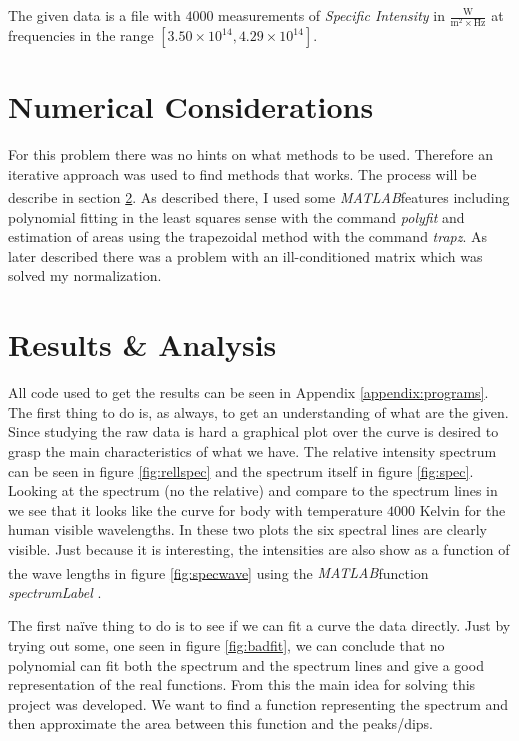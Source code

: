 \documentclass[10pt, a4paper]{article}
\newcommand{\matlab}{\small{\emph{MATLAB\textsuperscript{\textregistered}}}}
\begin{document}
The given data is a file with $4000$ measurements of \emph{Specific Intensity} in $\frac{\mathrm{W}}{\mathrm{m}^2\times \mathrm{Hz}}$ at frequencies in the range $[3.50\times10^{14}, 4.29\times10^{14}]$.

\section{Numerical Considerations}
For this problem there was no hints on what methods to be used. Therefore an iterative approach was used to find methods that works. The process will be describe in section \ref{sec:result}. As described there, I used some \matlab features including polynomial fitting in the least squares sense with the command \emph{polyfit} and estimation of areas using the trapezoidal method with the command \emph{trapz}. As later described there was a problem with an ill-conditioned matrix which was solved my normalization.

\section{Results \& Analysis} \label{sec:result}
All code used to get the results can be seen in Appendix \ref{appendix:programs}. The first thing to do is, as always, to get an understanding of what are the given. Since studying the raw data is hard a graphical plot over the curve is desired to grasp the main characteristics of what we have. The relative intensity spectrum can be seen in figure \ref{fig:rellspec} and the spectrum itself in figure \ref{fig:spec}. Looking at the spectrum (no the relative) and compare to the spectrum lines in \cite{astronotes1} we see that it looks like the curve for body with temperature $4000$ Kelvin for the human visible wavelengths. In these two plots the six spectral lines are clearly visible. Just because it is interesting, the intensities are also show as a function of the wave lengths in figure \ref{fig:specwave} using the \matlab function \emph{spectrumLabel} \cite{spectrumLabel}.

The first na\"{i}ve thing to do is to see if we can fit a curve the data directly. Just by trying out some, one seen in figure \ref{fig:badfit}, we can conclude that no polynomial can fit both the spectrum and the spectrum lines and give a good representation of the real functions. From this the main idea for solving this project was developed. We want to find a function representing the spectrum and then approximate the area between this function and the peaks/dips.
\end{document}
